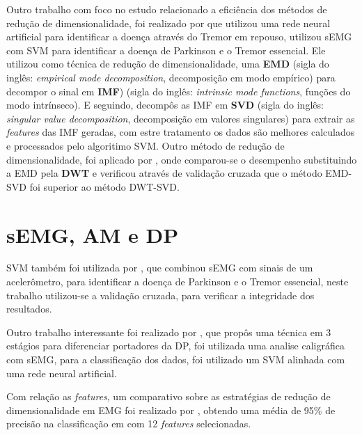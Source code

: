 Outro trabalho com foco no estudo relacionado a eficiência dos métodos de redução de dimensionalidade, foi realizado por  que utilizou uma rede neural artificial para identificar a doença através do Tremor em repouso,  utilizou sEMG com SVM para identificar a doença de Parkinson e o Tremor essencial. Ele utilizou como técnica de redução de dimensionalidade, uma \textbf{EMD} (sigla do inglês: \textit{empirical mode decomposition}, decomposição em modo empírico) para decompor o sinal em \textbf{IMF}) (sigla do inglês: \textit{intrinsic mode functions}, funções do modo intrínseco). E seguindo, decompôs as IMF em \textbf{SVD} (sigla do inglês: \textit{singular value decomposition}, decomposição em valores singulares) para extrair as \textit{features} das IMF geradas, com estre tratamento os dados são melhores calculados e processados pelo algoritimo SVM. Outro método de redução de dimensionalidade, foi aplicado por , onde comparou-se o desempenho substituindo a EMD pela \textbf{DWT} e verificou através de validação cruzada que o método EMD-SVD foi superior ao método DWT-SVD.

\section{sEMG, AM e DP}
SVM também foi utilizada por \cite{kugler2013automated}, que combinou sEMG com sinais de um acelerômetro, para identificar a doença de Parkinson e o Tremor essencial, neste trabalho utilizou-se a validação cruzada, para verificar a integridade dos resultados.

Outro trabalho interessante foi realizado por \cite{loconsole2018model}, que propôs uma técnica em 3 estágios para diferenciar portadores da DP, foi utilizada uma analise caligráfica com sEMG, para a classificação dos dados, foi utilizado um SVM alinhada com uma rede neural artificial.

Com relação as \textit{features}, um comparativo sobre as estratégias de redução de dimensionalidade em EMG foi realizado por \cite{liu2014feature}, obtendo uma média de 95\% de precisão na classificação em com 12 \textit{features} selecionadas. 